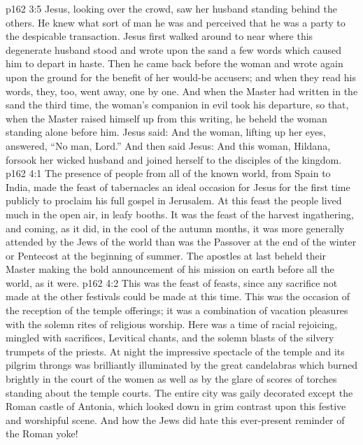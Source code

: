 \vs p162 3:5 Jesus, looking over the crowd, saw her husband standing behind the others. He knew what sort of man he was and perceived that he was a party to the despicable transaction. Jesus first walked around to near where this degenerate husband stood and wrote upon the sand a few words which caused him to depart in haste. Then he came back before the woman and wrote again upon the ground for the benefit of her would\hyp{}be accusers; and when they read his words, they, too, went away, one by one. And when the Master had written in the sand the third time, the woman’s companion in evil took his departure, so that, when the Master raised himself up from this writing, he beheld the woman standing alone before him. Jesus said:  And the woman, lifting up her eyes, answered, “No man, Lord.” And then said Jesus:  And this woman, Hildana, forsook her wicked husband and joined herself to the disciples of the kingdom.
\vs p162 4:1 The presence of people from all of the known world, from Spain to India, made the feast of tabernacles an ideal occasion for Jesus for the first time publicly to proclaim his full gospel in Jerusalem. At this feast the people lived much in the open air, in leafy booths. It was the feast of the harvest ingathering, and coming, as it did, in the cool of the autumn months, it was more generally attended by the Jews of the world than was the Passover at the end of the winter or Pentecost at the beginning of summer. The apostles at last beheld their Master making the bold announcement of his mission on earth before all the world, as it were.
\vs p162 4:2 This was the feast of feasts, since any sacrifice not made at the other festivals could be made at this time. This was the occasion of the reception of the temple offerings; it was a combination of vacation pleasures with the solemn rites of religious worship. Here was a time of racial rejoicing, mingled with sacrifices, Levitical chants, and the solemn blasts of the silvery trumpets of the priests. At night the impressive spectacle of the temple and its pilgrim throngs was brilliantly illuminated by the great candelabras which burned brightly in the court of the women as well as by the glare of scores of torches standing about the temple courts. The entire city was gaily decorated except the Roman castle of Antonia, which looked down in grim contrast upon this festive and worshipful scene. And how the Jews did hate this ever\hyp{}present reminder of the Roman yoke!
